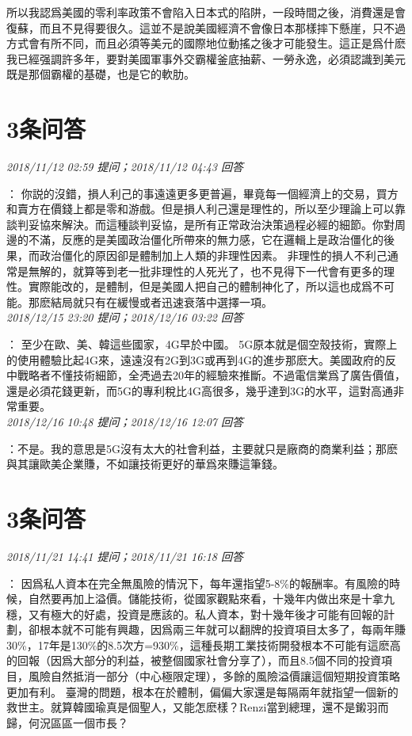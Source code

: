 \documentclass[twocolumn]{ctexart}
\begin{document}
所以我認爲美國的零利率政策不會陷入日本式的陷阱，一段時間之後，消費還是會復蘇，而且不見得要很久。這並不是說美國經濟不會像日本那樣摔下懸崖，只不過方式會有所不同，而且必須等美元的國際地位動搖之後才可能發生。這正是爲什麽我已經强調許多年，要對美國軍事外交霸權釜底抽薪、一勞永逸，必須認識到美元既是那個霸權的基礎，也是它的軟肋。
\\

\section{3条问答}

\textit{\hfill\noindent\small 2018/11/12 02:59 提问；2018/11/12 04:43 回答}

：
你説的沒錯，損人利己的事遠遠更多更普遍，畢竟每一個經濟上的交易，買方和賣方在價錢上都是零和游戲。但是損人利己還是理性的，所以至少理論上可以靠談判妥協來解決。而這種談判妥協，是所有正常政治決策過程必經的細節。你對周邊的不滿，反應的是美國政治僵化所帶來的無力感，它在邏輯上是政治僵化的後果，而政治僵化的原因卻是體制加上人類的非理性因素。 
非理性的損人不利己通常是無解的，就算等到老一批非理性的人死光了，也不見得下一代會有更多的理性。實際能改的，是體制，但是美國人把自己的體制神化了，所以這也成爲不可能。那麽結局就只有在緩慢或者迅速衰落中選擇一項。
\\

\textit{\hfill\noindent\small 2018/12/15 23:20 提问；2018/12/16 03:22 回答}

：
至少在歐、美、韓這些國家，4G早於中國。
5G原本就是個空殼技術，實際上的使用體驗比起4G來，遠遠沒有2G到3G或再到4G的進步那麽大。美國政府的反中戰略者不懂技術細節，全凴過去20年的經驗來推斷。不過電信業爲了廣告價值，還是必須花錢更新，而5G的專利稅比4G高很多，幾乎達到3G的水平，這對高通非常重要。
\\

\textit{\hfill\noindent\small 2018/12/16 10:48 提问；2018/12/16 12:07 回答}

：不是。我的意思是5G沒有太大的社會利益，主要就只是廠商的商業利益；那麽與其讓歐美企業賺，不如讓技術更好的華爲來賺這筆錢。
\\

\section{3条问答}

\textit{\hfill\noindent\small 2018/11/21 14:41 提问；2018/11/21 16:18 回答}

：
因爲私人資本在完全無風險的情況下，每年還指望5-8\%的報酬率。有風險的時候，自然要再加上溢價。儲能技術，從國家觀點來看，十幾年内做出來是十拿九穩，又有極大的好處，投資是應該的。私人資本，對十幾年後才可能有回報的計劃，卻根本就不可能有興趣，因爲兩三年就可以翻牌的投資項目太多了，每兩年賺30\%，17年是130\%的8.5次方=930\%，這種長期工業技術開發根本不可能有這麽高的回報（因爲大部分的利益，被整個國家社會分享了），而且8.5個不同的投資項目，風險自然抵消一部分（中心極限定理），多餘的風險溢價讓這個短期投資策略更加有利。
臺灣的問題，根本在於體制，偏偏大家還是每隔兩年就指望一個新的救世主。就算韓國瑜真是個聖人，又能怎麽樣？Renzi當到總理，還不是鎩羽而歸，何況區區一個市長？
\\
\end{document}
